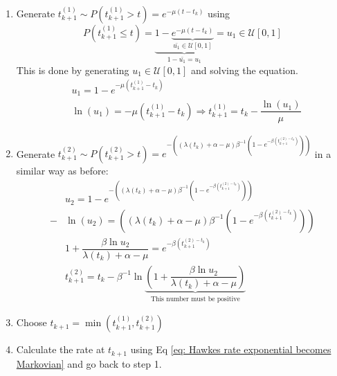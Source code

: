 \begin{enumerate}
    \item Generate $t_{k+1}^{(1)}\sim P \left( t_{k+1}^{(1)}>t \right) = e^{-\mu\left( t-t_k \right)}$ using 
    $$P\left( t_{k+1}^{(1)}\leq t \right) = \underbrace{1- \underbrace{e^{-\mu(t-t_k)}}_{\bar{u_1}\in\mathcal{U}[0,1]}}_{1-\bar{u_1}=u_1}=u_1 \in \mathcal{U}[0,1]$$
    This is done by generating $u_1\in\mathcal{U}[0,1]$ and solving the equation.
    \begin{equation}
        \begin{split}
        &u_1=1-e^{-\mu\left( t_{k+1}^{(1)}-t_k \right)}\\
        &\ln(u_1)=-\mu\left( t_{k+1}^{(1)}-t_k  \right)\Rightarrow t_{k+1}^{(1)}=t_k-\dfrac{\ln(u_1)}{\mu}            
        \end{split}
        \label{eq: inter-event time 1}
    \end{equation}
    \item Generate $t_{k+1}^{(2)}\sim P\left( t_{k+1}^{(2)}>t \right)=e^{-\left( \left( \lambda(t_k)+\alpha-\mu \right)\beta^{-1}\left( 1-e^{-\beta\left( t_{k+1}^{(2)-t_k}\right)}\right)\right)}$
    in a similar way as before:
    \begin{equation}
        \begin{split}
            &u_2=1-e^{-\left( \left( \lambda(t_k)+\alpha-\mu \right)\beta^{-1}\left( 1-e^{-\beta\left( t_{k+1}^{(2)-t_k}\right)}\right)\right)}\\
            -&\ln(u_2)=\left( \left( \lambda(t_k)+\alpha-\mu \right)\beta^{-1}\left( 1-e^{-\beta\left( t_{k+1}^{(2)-t_k}\right)}\right)\right)\\ 
            & 1+\dfrac{\beta\ln u_2}{\lambda(t_k)+\alpha-\mu}=e^{-\beta\left( t_{k+1}^{(2)-t_k}\right)}\\
            &t_{k+1}^{(2)}=t_k-\beta^{-1}\ln\underbrace{\left( 1+\dfrac{\beta\ln u_2}{\lambda(t_k)+\alpha-\mu} \right)}_{\text{This number must be positive}}   
        \end{split}
        \label{eq: inter-event time 2}
    \end{equation}   
    \item Choose $t_{k+1}=\min\left( t_{k+1}^{(1)},t_{k+1}^{(2)} \right)$
    \item Calculate the rate at $t_{k+1}$ using Eq \ref{eq: Hawkes rate exponential becomes Markovian} and go back to step 1.
\end{enumerate}

